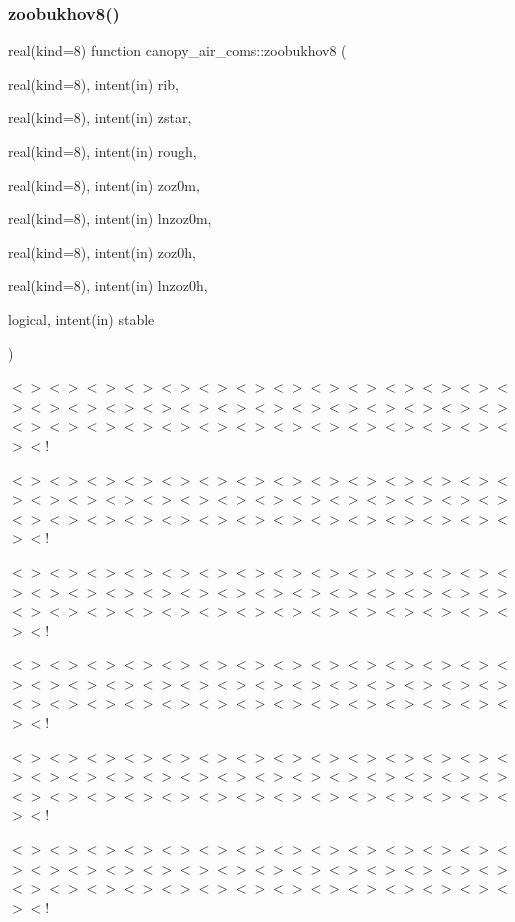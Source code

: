 \subsubsection{\texorpdfstring{zoobukhov8()}{zoobukhov8()}}
{\footnotesize\ttfamily real(kind=8) function canopy\+\_\+air\+\_\+coms\+::zoobukhov8 (\begin{DoxyParamCaption}\item[{real(kind=8), intent(in)}]{rib,  }\item[{real(kind=8), intent(in)}]{zstar,  }\item[{real(kind=8), intent(in)}]{rough,  }\item[{real(kind=8), intent(in)}]{zoz0m,  }\item[{real(kind=8), intent(in)}]{lnzoz0m,  }\item[{real(kind=8), intent(in)}]{zoz0h,  }\item[{real(kind=8), intent(in)}]{lnzoz0h,  }\item[{logical, intent(in)}]{stable }\end{DoxyParamCaption})}

$<$$>$$<$$>$$<$$>$$<$$>$$<$$>$$<$$>$$<$$>$$<$$>$$<$$>$$<$$>$$<$$>$$<$$>$$<$$>$$<$$>$$<$$>$$<$$>$$<$$>$$<$$>$$<$$>$$<$$>$$<$$>$$<$$>$$<$$>$$<$$>$$<$$>$$<$$>$$<$$>$$<$$>$$<$$>$$<$$>$$<$$>$$<$$>$$<$$>$$<$$>$$<$$>$$<$$>$$<$$>$$<$$>$$<$$>$$<$$>$$<$$>$$<$!

$<$$>$$<$$>$$<$$>$$<$$>$$<$$>$$<$$>$$<$$>$$<$$>$$<$$>$$<$$>$$<$$>$$<$$>$$<$$>$$<$$>$$<$$>$$<$$>$$<$$>$$<$$>$$<$$>$$<$$>$$<$$>$$<$$>$$<$$>$$<$$>$$<$$>$$<$$>$$<$$>$$<$$>$$<$$>$$<$$>$$<$$>$$<$$>$$<$$>$$<$$>$$<$$>$$<$$>$$<$$>$$<$$>$$<$$>$$<$$>$$<$$>$$<$!

$<$$>$$<$$>$$<$$>$$<$$>$$<$$>$$<$$>$$<$$>$$<$$>$$<$$>$$<$$>$$<$$>$$<$$>$$<$$>$$<$$>$$<$$>$$<$$>$$<$$>$$<$$>$$<$$>$$<$$>$$<$$>$$<$$>$$<$$>$$<$$>$$<$$>$$<$$>$$<$$>$$<$$>$$<$$>$$<$$>$$<$$>$$<$$>$$<$$>$$<$$>$$<$$>$$<$$>$$<$$>$$<$$>$$<$$>$$<$$>$$<$$>$$<$!

$<$$>$$<$$>$$<$$>$$<$$>$$<$$>$$<$$>$$<$$>$$<$$>$$<$$>$$<$$>$$<$$>$$<$$>$$<$$>$$<$$>$$<$$>$$<$$>$$<$$>$$<$$>$$<$$>$$<$$>$$<$$>$$<$$>$$<$$>$$<$$>$$<$$>$$<$$>$$<$$>$$<$$>$$<$$>$$<$$>$$<$$>$$<$$>$$<$$>$$<$$>$$<$$>$$<$$>$$<$$>$$<$$>$$<$$>$$<$$>$$<$$>$$<$!

$<$$>$$<$$>$$<$$>$$<$$>$$<$$>$$<$$>$$<$$>$$<$$>$$<$$>$$<$$>$$<$$>$$<$$>$$<$$>$$<$$>$$<$$>$$<$$>$$<$$>$$<$$>$$<$$>$$<$$>$$<$$>$$<$$>$$<$$>$$<$$>$$<$$>$$<$$>$$<$$>$$<$$>$$<$$>$$<$$>$$<$$>$$<$$>$$<$$>$$<$$>$$<$$>$$<$$>$$<$$>$$<$$>$$<$$>$$<$$>$$<$$>$$<$!

$<$$>$$<$$>$$<$$>$$<$$>$$<$$>$$<$$>$$<$$>$$<$$>$$<$$>$$<$$>$$<$$>$$<$$>$$<$$>$$<$$>$$<$$>$$<$$>$$<$$>$$<$$>$$<$$>$$<$$>$$<$$>$$<$$>$$<$$>$$<$$>$$<$$>$$<$$>$$<$$>$$<$$>$$<$$>$$<$$>$$<$$>$$<$$>$$<$$>$$<$$>$$<$$>$$<$$>$$<$$>$$<$$>$$<$$>$$<$$>$$<$$>$$<$!

